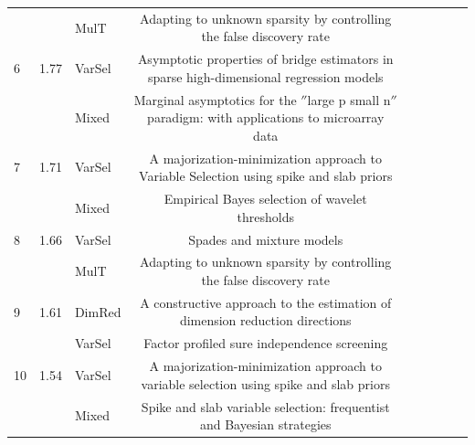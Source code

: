 \documentclass[AMS,STIX1COL]{WileyNJD-v2}
\begin{document}
\begin{landscape}
\begin{table}[t]
\begin{tabular}{lclclclcl}
     &                           & MulT      & Adapting to unknown sparsity by controlling the false discovery rate                          &                                                             \\
6    & 1.77                      & VarSel    & Asymptotic properties of bridge estimators in sparse high-dimensional regression models       &                                                             \\
     &                           & Mixed     & Marginal asymptotics for the $''$large p small n$''$ paradigm: with applications to microarray data                                                 &  \\
7    & 1.71                      & VarSel    & A majorization-minimization approach to Variable Selection using spike and slab priors        &                                                             \\
     &                           & Mixed     & Empirical Bayes selection of wavelet thresholds                                           &                                                             \\
8    & 1.66                      & VarSel    & Spades and mixture models                                                                     &                                                             \\
     &                           & MulT      & Adapting to unknown sparsity by controlling the false discovery rate                          &                                                             \\
9    & 1.61                      & DimRed    & A constructive approach to the estimation of dimension reduction directions                   &                                                             \\
     &                           & VarSel    & Factor profiled sure independence screening                                                   &                                                             \\
10   & 1.54                      & VarSel    & A majorization-minimization approach to variable selection using spike and slab priors        &                                                             \\
     &                           & Mixed     & Spike and slab variable selection: frequentist and Bayesian strategies                        &                                                             \\

\end{tabular}
\end{table}
\end{landscape}
\end{document}
